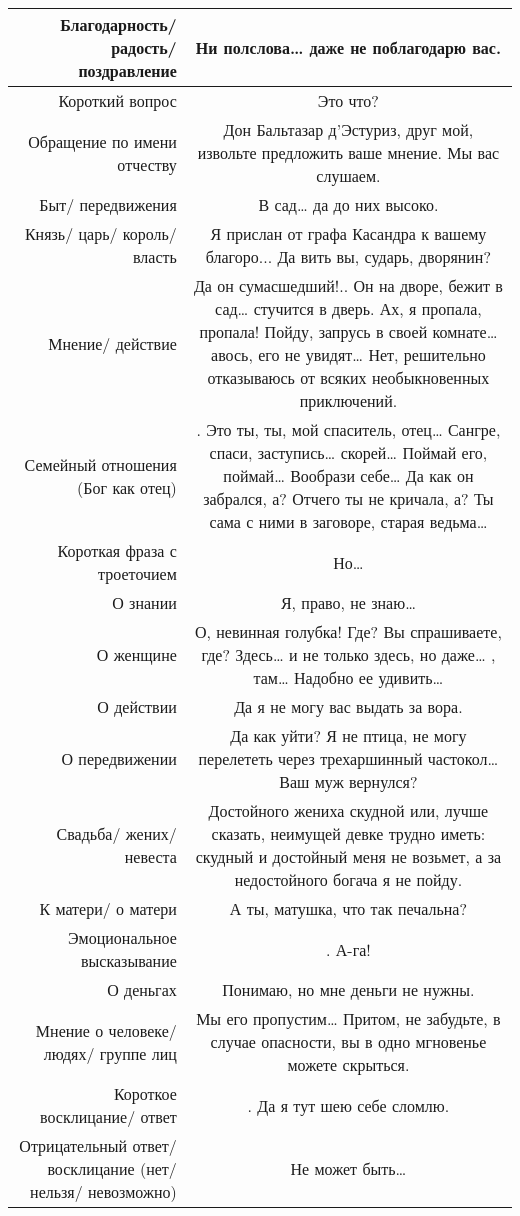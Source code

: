 \documentclass[a4paper,14pt]{article}
\begin{document}
\begin{center}
\begin{tabularx}{\linewidth}{ | N | C | }
Благодарность/ радость/ поздравление&Ни полслова… даже не поблагодарю вас.\\ \hline
Короткий вопрос&Это что?\\ \hline
Обращение по имени отчеству&Дон Бальтазар д'Эстуриз, друг мой, извольте предложить ваше мнение. Мы вас слушаем.\\ \hline
Быт/ передвижения&В сад… да до них высоко.\\ \hline
Князь/ царь/ король/ власть&Я прислан от графа Касандра к вашему благоро... Да вить вы, сударь, дворянин?\\ \hline
Мнение/ действие&Да он сумасшедший!.. Он на дворе, бежит в сад… стучится в дверь. Ах, я пропала,             пропала! Пойду, запрусь в своей комнате… авось, его не увидят… Нет, решительно отказываюсь от всяких необыкновенных приключений.\\ \hline
Семейный отношения (Бог как отец)&. Это ты, ты, мой спаситель, отец… Сангре, спаси, заступись… скорей… Поймай его, поймай… Вообрази себе…  Да как он забрался, а? Отчего ты не кричала, а? Ты сама с ними в             заговоре, старая ведьма…\\ \hline
Короткая фраза с троеточием&Но…\\ \hline
О знании&Я, право, не знаю…\\ \hline
О женщине&О, невинная голубка!  Где? Вы спрашиваете, где? Здесь… и не только здесь, но даже… ,             там…  Надобно ее удивить…\\ \hline
О действии&Да я не могу вас выдать за вора.\\ \hline
О передвижении&Да как уйти? Я не птица, не могу перелететь через трехаршинный частокол… Ваш муж             вернулся?\\ \hline
Свадьба/ жених/ невеста&Достойного жениха скудной или, лучше сказать, неимущей девке трудно иметь: скудный и достойный меня не возьмет, а за недостойного богача я не пойду.\\ \hline
К матери/ о матери&А ты, матушка, что так печальна?\\ \hline
Эмоциональное высказывание&. А-га!\\ \hline
О деньгах&Понимаю, но мне деньги не нужны.\\ \hline
Мнение о человеке/ людях/ группе лиц&Мы его пропустим… Притом, не забудьте, в случае опасности, вы в одно мгновенье можете  скрыться.\\ \hline
Короткое восклицание/ ответ&. Да я тут шею себе сломлю.\\ \hline
Отрицательный ответ/ восклицание (нет/ нельзя/ невозможно)&Не может быть…\\ \hline

\end{tabularx}
\end{center}
\end{document}
